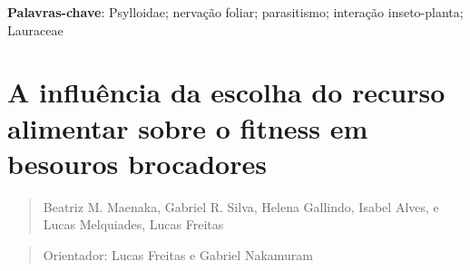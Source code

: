\documentclass[
]{book}
\begin{document}
\textbf{Palavras-chave}: Psylloidae; nervação foliar; parasitismo; interação inseto-planta; Lauraceae

\chapter{A influência da escolha do recurso alimentar sobre o fitness em besouros brocadores}\label{a-influuxeancia-da-escolha-do-recurso-alimentar-sobre-o-fitness-em-besouros-brocadores}

\begin{quote}
Beatriz M. Maenaka, Gabriel R. Silva, Helena Gallindo, Isabel Alves, e Lucas Melquiades, Lucas Freitas
\end{quote}

\begin{quote}
Orientador: Lucas Freitas e Gabriel Nakamuram
\end{quote}
\end{document}
